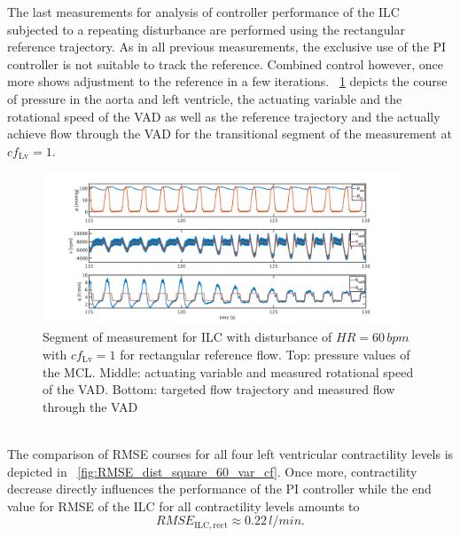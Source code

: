The last measurements for analysis of controller performance of the ILC subjected to a repeating disturbance are performed using the rectangular reference trajectory. As in all previous measurements, the exclusive use of the PI controller is not suitable to track the reference. Combined control however, once more shows adjustment to the reference in a few iterations. \figurename~\ref{fig:pi_to_ilc_dist_square_60_cf1} depicts the course of pressure in the aorta and left ventricle, the actuating variable and the rotational speed of the VAD as well as the reference trajectory and the actually achieve flow through the VAD for the transitional segment of the measurement at $cf_{\mathrm{Lv}}=1$.
\begin{figure}[ht!]
  \centering
  \includegraphics[width=0.95\textwidth]{images/chapt_5/ILC/pi_to_ilc_dist_square_60_cf1.pdf}
  \caption[Segment of measurement for ILC with disturbance of $HR=60\,bpm$ with $cf_{\mathrm{Lv}}=1$ for rectangular reference flow]{Segment of measurement for ILC with disturbance of $HR=60\,bpm$ with $cf_{\mathrm{Lv}}=1$ for rectangular reference flow. Top:  pressure values of the MCL. Middle: actuating variable and measured rotational speed of the VAD. Bottom: targeted flow trajectory and measured flow through the VAD}
  \label{fig:pi_to_ilc_dist_square_60_cf1}
\end{figure}
\\The comparison of RMSE courses for all four left ventricular contractility levels is depicted in \figurename~\ref{fig:RMSE_dist_square_60_var_cf}. Once more, contractility decrease directly influences the performance of the PI controller while the end value for RMSE of the ILC for all contractility levels amounts to
\begin{equation}
  RMSE_{\mathrm{ILC,rect}}\approx 0.22\,l/min.
\end{equation}
